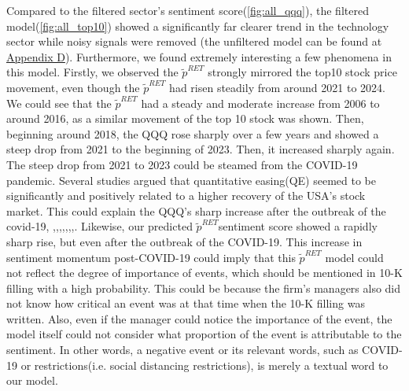 \documentclass[logo,bsc,singlespacing,parskip]{infthesis}
\begin{document}
Compared to the filtered sector’s sentiment score(\ref{fig:all_qqq}), the filtered model(\ref{fig:all_top10}) showed a significantly far clearer trend in the technology sector while noisy signals were removed (the unfiltered model can be found at \hyperref[appendix_all_top10]{Appendix D}). Furthermore, we found extremely interesting a few phenomena in this model. Firstly, we observed the $\tilde{p}^{RET}$ strongly mirrored the top10 stock price movement, even though the $\tilde{p}^{RET}$ had risen steadily from around 2021 to 2024. We could see that the $\tilde{p}^{RET}$ had a steady and moderate increase from 2006 to around 2016, as a similar movement of the top 10 stock was shown. Then, beginning around 2018, the QQQ rose sharply over a few years and showed a steep drop from 2021 to the beginning of 2023. Then, it increased sharply again. The steep drop from 2021 to 2023 could be steamed from the COVID-19 pandemic. Several studies argued that quantitative easing(QE) seemed to be significantly and positively related to a higher recovery of the USA’s stock market. This could explain the QQQ’s sharp increase after the outbreak of the covid-19, \cite{Gagnon2010},\cite{Chen2011},\cite{Curdia2013},\cite{Gilchrist2013},\cite{Wang2019},\cite{Sunder2021},\cite{Seven2021},\cite{Gourinchas2021}. Likewise, our predicted $\tilde{p}^{RET}$sentiment score showed a rapidly sharp rise, but even after the outbreak of the COVID-19. This increase in sentiment momentum post-COVID-19 could imply that this $\tilde{p}^{RET}$ model could not reflect the degree of importance of events, which should be mentioned in 10-K filling with a high probability. This could be because the firm’s managers also did not know how critical an event was at that time when the 10-K filling was written. Also, even if the manager could notice the importance of the event, the model itself could not consider what proportion of the event is attributable to the sentiment. In other words, a negative event or its relevant words, such as COVID-19 or restrictions(i.e. social distancing restrictions), is merely a textual word to our model.   
\end{document}
